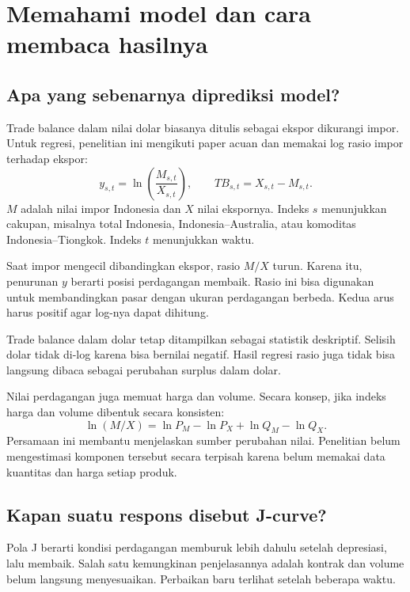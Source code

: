 \section{Memahami model dan cara membaca hasilnya}\label{sec:methods}
\subsection{Apa yang sebenarnya diprediksi model?}
Trade balance dalam nilai dolar biasanya ditulis sebagai ekspor dikurangi impor. Untuk regresi, penelitian ini mengikuti paper acuan dan memakai log rasio impor terhadap ekspor:
\begin{equation}
 y_{s,t}=\ln\left(\frac{M_{s,t}}{X_{s,t}}\right),
 \qquad TB_{s,t}=X_{s,t}-M_{s,t}.\label{eq:outcome}
\end{equation}
$M$ adalah nilai impor Indonesia dan $X$ nilai ekspornya. Indeks $s$ menunjukkan cakupan, misalnya total Indonesia, Indonesia--Australia, atau komoditas Indonesia--Tiongkok. Indeks $t$ menunjukkan waktu.

Saat impor mengecil dibandingkan ekspor, rasio $M/X$ turun. Karena itu, penurunan $y$ berarti posisi perdagangan membaik. Rasio ini bisa digunakan untuk membandingkan pasar dengan ukuran perdagangan berbeda. Kedua arus harus positif agar log-nya dapat dihitung.

Trade balance dalam dolar tetap ditampilkan sebagai statistik deskriptif. Selisih dolar tidak di-log karena bisa bernilai negatif. Hasil regresi rasio juga tidak bisa langsung dibaca sebagai perubahan surplus dalam dolar.


Nilai perdagangan juga memuat harga dan volume. Secara konsep, jika indeks harga dan volume dibentuk secara konsisten:
\begin{equation}
 \ln(M/X)=\ln P_M-\ln P_X+\ln Q_M-\ln Q_X.\label{eq:value}
\end{equation}
Persamaan ini membantu menjelaskan sumber perubahan nilai. Penelitian belum mengestimasi komponen tersebut secara terpisah karena belum memakai data kuantitas dan harga setiap produk.

\subsection{Kapan suatu respons disebut J-curve?}
Pola J berarti kondisi perdagangan memburuk lebih dahulu setelah depresiasi, lalu membaik. Salah satu kemungkinan penjelasannya adalah kontrak dan volume belum langsung menyesuaikan. Perbaikan baru terlihat setelah beberapa waktu.

